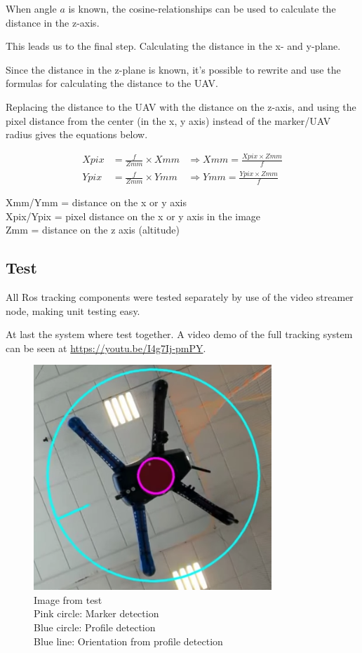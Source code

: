 When angle $a$ is known, the cosine-relationships can be used to calculate the distance in the z-axis.

This leads us to the final step. Calculating the distance in the x- and y-plane.
 
Since the distance in the z-plane is known, it's possible to rewrite and use the formulas for calculating the distance to the UAV. 

Replacing the distance to the UAV with the distance on the z-axis, and using the pixel distance from the center (in the x, y axis) instead of the marker/UAV radius gives the equations below.

\begin{align}
X\mathit{pix}&= \frac{f}{Z\mathit{mm}}\times X\mathit{mm} &\Rightarrow X\mathit{mm}=\frac{X\mathit{pix}\times Z\mathit{mm}}{f}\nonumber\\
Y\mathit{pix}&= \frac{f}{Z\mathit{mm}}\times Y\mathit{mm} &\Rightarrow Ymm=\frac{Ypix\times Zmm}{f}\nonumber
\end{align}
\begin{center}
	Xmm/Ymm = distance on the x or y axis\\
	Xpix/Ypix = pixel distance on the x or y axis in the image\\
	Zmm = distance on the z axis (altitude)
\end{center}
\subsection{Test}
All Ros tracking components were tested separately by use of the video streamer node, making unit testing easy.

At last the system where test together. A video demo of the full tracking system can be seen at \url{https://youtu.be/I4g7Ij-pmPY}.
\begin{figure}
	\centering
	\includegraphics[width=0.8\textwidth]{imgs/tracking-test-indoors}\\
	Image from test\\Pink circle: Marker detection\\
	Blue circle: Profile detection\\Blue line: Orientation from profile detection
\end{figure}
